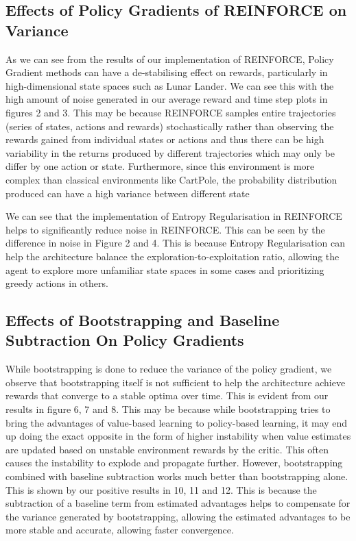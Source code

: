 \documentclass{article}
\begin{document}
\subsection{Effects of Policy Gradients of REINFORCE on Variance}
As we can see from the results of our implementation of REINFORCE, Policy Gradient methods can have a de-stabilising effect on rewards, particularly in high-dimensional state spaces such as Lunar Lander. We can see this with the high amount of noise generated in our average reward and time step plots in figures 2 and 3. This may be because REINFORCE samples entire trajectories (series of states, actions and rewards) stochastically rather than observing the rewards gained from individual states or actions and thus there can be high variability in the returns produced by different trajectories which may only be differ by one action or state. Furthermore, since this environment is more complex than classical environments like CartPole, the probability distribution produced can have a high variance between different state%
\par We can see that the implementation of Entropy Regularisation in REINFORCE helps to significantly reduce noise in REINFORCE. This can be seen by the difference in noise in Figure 2 and 4. This is because Entropy Regularisation can help the architecture balance the exploration-to-exploitation ratio, allowing the agent to explore more unfamiliar state spaces in some cases and prioritizing greedy actions in others.

\subsection{Effects of Bootstrapping and Baseline Subtraction On Policy Gradients}
While bootstrapping is done to reduce the variance of the policy gradient, we observe that bootstrapping itself is not sufficient to help the architecture achieve rewards that converge to a stable optima over time. This is evident from our results in figure 6, 7 and 8. This may be because while bootstrapping tries to bring the advantages of value-based learning to policy-based learning, it may end up doing the exact opposite in the form of higher instability when value estimates are updated based on unstable environment rewards by the critic. This often causes the instability to explode and propagate further. \newline
However, bootstrapping combined with baseline subtraction works much better than bootstrapping alone. This is shown by our positive results in 10, 11 and 12. This is because the subtraction of a baseline term from estimated advantages helps to compensate for the variance generated by bootstrapping, allowing the estimated advantages to be more stable and accurate, allowing faster convergence.
\end{document}
